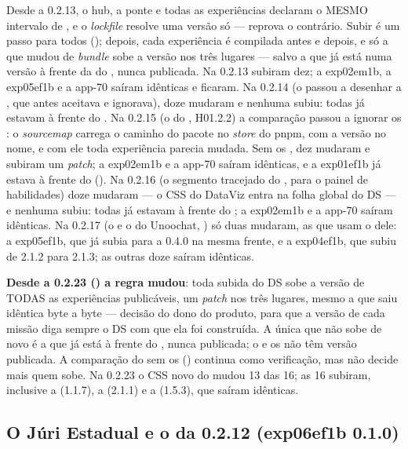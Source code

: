 Desde a 0.2.13, o hub, a ponte  e todas as experiências
declaram o MESMO intervalo de , e o
\emph{lockfile} resolve uma versão só ---
 reprova o contrário.
Subir é um passo para todos (); depois, cada experiência é
compilada antes e depois, e só a que mudou de \emph{bundle} sobe a versão nos
três lugares --- salvo a que já está numa versão à frente da do ,
nunca publicada. Na 0.2.13 subiram dez; a exp02em1b, a exp05ef1b e a app-70
saíram idênticas e ficaram. Na 0.2.14 (o  passou a desenhar a
, que antes aceitava e ignorava), doze mudaram e nenhuma subiu:
todas já estavam à frente do . Na 0.2.15 (o  do
, H01.2.2) a comparação passou a ignorar os : o
\emph{sourcemap} carrega o caminho do pacote no \emph{store} do pnpm, com a
versão no nome, e com ele toda experiência parecia mudada. Sem os ,
dez mudaram e subiram um \emph{patch}; a exp02em1b e a app-70 saíram idênticas,
e a exp01ef1b já estava à frente do  (). Na 0.2.16 (o
segmento tracejado do , para o painel de habilidades)
doze mudaram --- o CSS do DataViz entra na folha global do DS --- e nenhuma
subiu: todas já estavam à frente do ; a exp02em1b e a app-70 saíram
idênticas. Na 0.2.17 (o  e o  do Unoochat,
) só duas mudaram, as que usam o  dele: a
exp05ef1b, que já subia para a 0.4.0 na mesma frente, e a exp04ef1b, que subiu
de 2.1.2 para 2.1.3; as outras doze saíram idênticas.

\textbf{Desde a 0.2.23 () a regra mudou}: toda subida do DS
sobe a versão de TODAS as experiências publicáveis, um \emph{patch} nos três
lugares, mesmo a que saiu idêntica byte a byte --- decisão do dono do produto,
para que a versão de cada missão diga sempre o DS com que ela foi construída.
A única que não sobe de novo é a que já está à frente do , nunca
publicada; o  e os  não têm versão publicada. A
comparação do  sem os  () continua como
verificação, mas não decide mais quem sobe. Na 0.2.23 o CSS novo do
 mudou 13 das 16; as 16 subiram, inclusive a 
(1.1.7), a  (2.1.1) e a  (1.5.3), que saíram
idênticas.

\subsection{O Júri Estadual e o  da 0.2.12 (exp06ef1b 0.1.0)}
\label{sec:ds-juri-0211}

